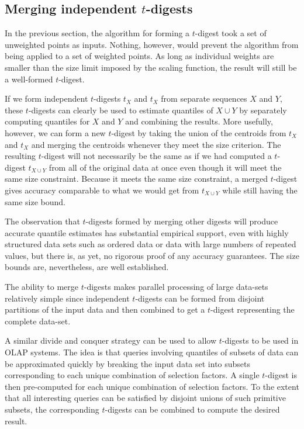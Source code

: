 \documentclass[11pt]{amsart}
\begin{document}
\subsection{Merging independent $t$-digests}
In the previous section, the algorithm for forming a $t$-digest took a set of unweighted points as inputs. Nothing, however, would prevent the algorithm from being applied to a set of weighted points. As long as individual weights are smaller than the size limit imposed by the scaling function, the result will still be a well-formed $t$-digest.

If we form independent $t$-digests $t_X$ and $t_X$ from separate sequences $X$ and $Y$, these $t$-digests can clearly be used to estimate quantiles of $X \cup Y$ by separately computing quantiles for $X$ and $Y$ and combining the results. More usefully, however, we can form a new $t$-digest by taking the union of the centroids from $t_X$ and $t_X$ and merging the centroids whenever they meet the size criterion. The resulting $t$-digest will not necessarily be the same as if we had computed a $t$-digest $t_{X \cup Y}$ from all of the original data at once even though it will meet the same size constraint. Because it meets the same size constraint, a merged $t$-digest gives accuracy comparable to what we would get from $t_{X\cup Y}$ while still having the same size bound.

The observation that $t$-digests formed by merging other digests will produce accurate quantile estimates has substantial empirical support, even with highly structured data sets such as ordered data or data with large numbers of repeated values, but there is, as yet, no rigorous proof of any accuracy guarantees. The size bounds are, nevertheless, are well established.

The ability to merge $t$-digests makes parallel processing of large data-sets relatively simple since independent $t$-digests can be formed from disjoint partitions of the input data and then combined to get a $t$-digest representing the complete data-set.

A similar divide and conquer strategy can be used to allow $t$-digests to be used in OLAP systems. The idea is that queries involving quantiles of subsets of data can be approximated quickly by breaking the input data set into subsets corresponding to each unique combination of selection factors. A single $t$-digest is then pre-computed for each unique combination of selection factors. To the extent that all interesting queries can be satisfied by disjoint unions of such primitive subsets, the corresponding $t$-digests can be combined to compute the desired result.
\end{document}
